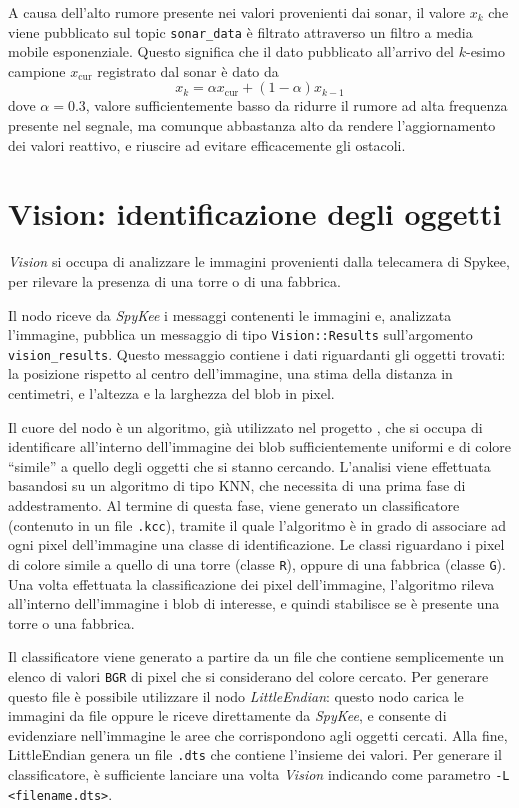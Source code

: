 A causa dell'alto rumore presente nei valori provenienti dai sonar, il valore $x_k$ che viene pubblicato sul topic \verb|sonar_data| è filtrato attraverso un filtro a media mobile esponenziale. Questo significa che il dato pubblicato all'arrivo del $k$-esimo campione $x_\text{cur}$ registrato dal sonar è dato da
  \[ x_k = \alpha x_\text{cur} + (1 - \alpha) x_{k-1} \]
dove $\alpha = 0.3$, valore sufficientemente basso da ridurre il rumore ad alta frequenza presente nel segnale, ma comunque abbastanza alto da rendere l'aggiornamento dei valori reattivo, e riuscire ad evitare efficacemente gli ostacoli.

\section{Vision: identificazione degli oggetti}

\emph{Vision} si occupa di analizzare le immagini provenienti dalla telecamera di Spykee, per rilevare la presenza di una torre o di una fabbrica. 

Il nodo riceve da \emph{SpyKee} i messaggi contenenti le immagini e, analizzata l'immagine, pubblica un messaggio di tipo \verb|Vision::Results| sull'argomento \verb|vision_results|. Questo messaggio contiene i dati riguardanti gli oggetti trovati: la posizione rispetto al centro dell'immagine, una stima della distanza in centimetri, e l'altezza e la larghezza del blob in pixel.

Il cuore del nodo è un algoritmo, già utilizzato nel progetto \cite{docmandelli}, che si occupa di identificare all'interno dell'immagine dei blob sufficientemente uniformi e di colore ``simile'' a quello degli oggetti che si stanno cercando. L'analisi viene effettuata basandosi su un algoritmo di tipo KNN, che necessita di una prima fase di addestramento. Al termine di questa fase, viene generato un classificatore (contenuto in un file \verb|.kcc|), tramite il quale l'algoritmo è in grado di associare ad ogni pixel dell'immagine una classe di identificazione. Le classi riguardano i pixel di colore simile a quello di una torre (classe \verb|R|), oppure di una fabbrica (classe \verb|G|). Una volta effettuata la classificazione dei pixel dell'immagine, l'algoritmo rileva all'interno dell'immagine i blob di interesse, e quindi stabilisce se è presente una torre o una fabbrica.

Il classificatore viene generato a partire da un file che contiene semplicemente un elenco di valori \verb|BGR| di pixel che si considerano del colore cercato. Per generare questo file è possibile utilizzare il nodo \emph{LittleEndian}: questo nodo carica le immagini da file oppure le riceve direttamente da \emph{SpyKee}, e consente di evidenziare nell'immagine le aree che corrispondono agli oggetti cercati. Alla fine, LittleEndian genera un file \verb|.dts| che contiene l'insieme dei valori. Per generare il classificatore, è sufficiente lanciare una volta \emph{Vision} indicando come parametro \verb|-L <filename.dts>|.

